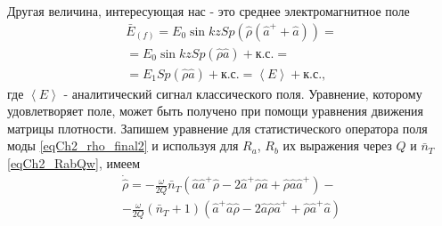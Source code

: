 Другая величина, интересующая нас - это среднее электромагнитное поле
\begin{eqnarray}
\bar{E}_{(f)} = E_0 \sin k z
Sp\left(\hat{\rho}\left(\hat{a}^{+} + \hat{a}\right)\right) = 
\nonumber \\
= E_0 \sin k z Sp\left(\hat{\rho}\hat{a}\right) + \mbox{к.с.} = 
\nonumber \\
= E_1 Sp\left(\hat{\rho}\hat{a}\right) + \mbox{к.с.} =
\left<E\right> + \mbox{к.с.}, 
\nonumber
\end{eqnarray}
где $\left<E\right>$ - аналитический сигнал классического
поля. 
Уравнение, которому удовлетворяет поле, может быть получено при
помощи уравнения движения матрицы плотности. Запишем уравнение для
статистического оператора поля моды  
\eqref{eqCh2_rho_final2} и
используя для $R_a$, $R_b$ их выражения через $Q$ и $\bar{n}_T$
  \eqref{eqCh2_RabQw}, имеем
\begin{eqnarray}
\dot{\hat{\rho}} =
- \frac{\omega}{2Q}\bar{n}_T
\left(\hat{a}\hat{a}^{+}\hat{\rho} - 
2 \hat{a}^{+}\hat{\rho}\hat{a} + \hat{\rho}\hat{a}\hat{a}^{+}
\right)
- 
\nonumber \\
- \frac{\omega}{2Q}\left(\bar{n}_T + 1\right)
\left(\hat{a}^{+}\hat{a}\hat{\rho} - 
2 \hat{a}\hat{\rho}\hat{a}^{+}
+ \hat{\rho}\hat{a}^{+}\hat{a}
\right)
\label{eqCh2_eq1_add1}
\end{eqnarray}

